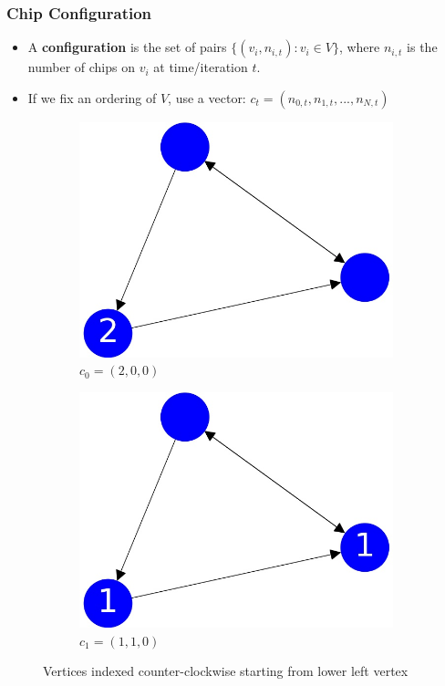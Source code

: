 \documentclass{beamer}
\begin{document}
\begin{frame}
\frametitle{Chip Configuration}

\begin{itemize}
\item A \textbf{configuration} is the set of pairs $\{(v_i,n_{i,t}) : v_i \in V\}$, where $n_{i,t}$
is the number of chips on $v_i$ at time/iteration $t$.

\item If we fix an ordering of $V$, use a vector: $c_t = (n_{0,t},n_{1,t},...,n_{N,t})$
\end{itemize}

\begin{figure}[h!]
  \centering
  \begin{subfigure}[b]{0.4\linewidth}
    \includegraphics[width=\linewidth]{sandpile_simple_0}
    \caption{$c_0 = (2,0,0)$}
  \end{subfigure}
  \begin{subfigure}[b]{0.4\linewidth}
    \includegraphics[width=\linewidth]{sandpile_simple_1}
    \caption{$c_1 = (1,1,0)$}
  \end{subfigure}
  \caption{Vertices indexed counter-clockwise starting from lower left vertex}

\end{figure}

\end{frame}
\end{document}
